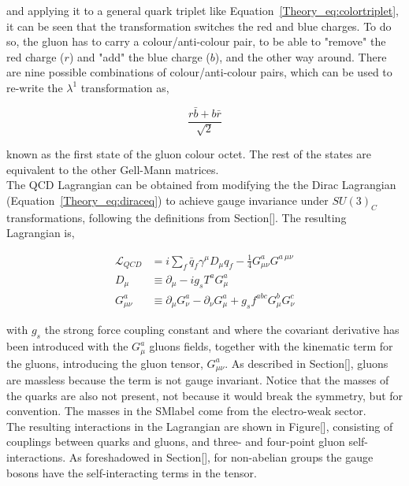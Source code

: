 and applying it to a general quark triplet like Equation~\ref{Theory_eq:colortriplet}, it can be seen that the transformation switches the red and blue charges. To do so, the gluon has to carry a colour/anti-colour pair, to be able to "remove" the red charge ($r$) and "add" the blue charge ($b$), and the other way around. There are nine possible combinations of colour/anti-colour pairs, which can be used to re-write the $\lambda^1$ transformation as,

\begin{equation}
\frac{r\bar{b}+b\bar{r}}{\sqrt{2}}
\end{equation}

known as the first state of the gluon colour octet. The rest of the states are equivalent to the other Gell-Mann matrices.\\

The QCD Lagrangian can be obtained from modifying the the Dirac Lagrangian (Equation~\ref{Theory_eq:diraceq}) to achieve gauge invariance under $SU(3)_C$ transformations, following the definitions from Section[]. The resulting Lagrangian is,

\begin{equation}
\label{Theory_eq:diraceq30}
\begin{split}
    \mathcal{L}_{QCD} &= i\sum_f \bar{q}_f\gamma^\mu D_\mu q_f - \frac{1}{4}G_{\mu\nu}^aG^{a\ \mu\nu} \\
    D_{\mu \ } &\equiv \partial_\mu -ig_sT^aG^a_\mu \\
    G_{\mu\nu}^a &\equiv \partial_\mu G_\nu^a - \partial_\nu G_\mu^a + g_s f^{abc}G_\mu^b G_\nu^c
\end{split}
\end{equation}

with $g_s$ the strong force coupling constant and where the covariant derivative has been introduced with the $G_\mu^a$ gluons fields, together with the kinematic term for the gluons, introducing the gluon tensor, $G_{\mu\nu}^a$. As described in Section[], gluons are massless because the term is not gauge invariant. Notice that the masses of the quarks are also not present, not because it would break the symmetry, but for convention. The masses in the \acrshort{SMlabel} come from the electro-weak sector. \\

The resulting interactions in the Lagrangian are shown in Figure[], consisting of couplings between quarks and gluons, and three- and four-point gluon self-interactions. As foreshadowed in Section[], for non-abelian groups the gauge bosons have the self-interacting terms in the tensor.

